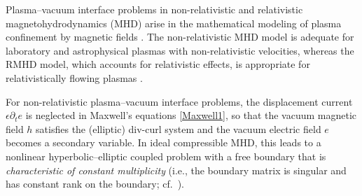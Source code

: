 \documentclass[twoside,11pt]{article}
\numberwithin{equation}{section}
\begin{document}
Plasma--vacuum interface problems in non-relativistic and relativistic magnetohydrodynamics (MHD) arise in the mathematical modeling of plasma confinement by magnetic fields \cite{GKP19,G84,BFKK58MR0091737}. The non-relativistic MHD model is adequate for laboratory and astrophysical plasmas with non-relativistic velocities, whereas the RMHD model, which accounts for relativistic effects, is appropriate for relativistically flowing plasmas \cite{A90zbMATH05040442,Lichnerowicz67,GKP19}.


For non-relativistic plasma--vacuum interface problems, the displacement current $\epsilon\partial_te$ is neglected in Maxwell's equations \eqref{Maxwell1}, so that the vacuum magnetic field $h$ satisfies the (elliptic) div-curl system and the vacuum electric field $e$ becomes a secondary variable. In ideal compressible MHD, this leads to a nonlinear hyperbolic--elliptic coupled problem with a free boundary that is {\it characteristic of constant multiplicity} (i.e., the boundary matrix is singular and has constant rank on the boundary; cf.~\cite{R85MR0797053,OSY95MR1346224,S95MMASMR1346663,S96aMR1401431}).
\end{document}
